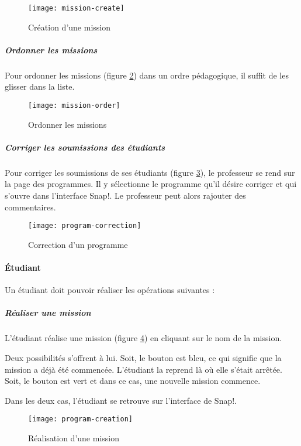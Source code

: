 \begin{figure}
  \begin{center}
    \texttt{[image: mission-create]}
    \caption{Création d'une mission}
    \label{fig:mission-create}
  \end{center}
\end{figure}

\subparagraph{Ordonner les missions} Pour ordonner les \glspl{mission} (figure \ref{fig:mission-order}) dans un ordre pédagogique, il suffit de les glisser dans la liste.
\begin{figure}
  \begin{center}
    \texttt{[image: mission-order]}
    \caption{Ordonner les missions}
    \label{fig:mission-order}
  \end{center}
\end{figure}

\subparagraph{Corriger les soumissions des étudiants} Pour corriger les soumissions de ses étudiants (figure \ref{fig:program-correction}), le professeur se rend sur la page des programmes. Il y sélectionne le programme qu'il désire corriger et qui s'ouvre dans l'interface Snap!. Le professeur peut alors rajouter des commentaires.
\begin{figure}
  \begin{center}
    \texttt{[image: program-correction]}
    \caption{Correction d'un programme}
    \label{fig:program-correction}
  \end{center}
\end{figure}

\paragraph{Étudiant}
Un étudiant doit pouvoir réaliser les opérations suivantes :
\subparagraph{Réaliser une mission} L'étudiant réalise une \gls{mission} (figure \ref{fig:program-creation}) en cliquant sur le nom de la \gls{mission}. 

Deux possibilités s'offrent à lui. Soit, le bouton est bleu, ce qui signifie que la \gls{mission} a déjà été commencée. L'étudiant la reprend là où elle s'était arrêtée. Soit, le bouton est vert et dans ce cas, une nouvelle \gls{mission} commence.

Dans les deux cas, l'étudiant se retrouve sur l'interface de Snap!.
\begin{figure}
  \begin{center}
    \texttt{[image: program-creation]}
    \caption{Réalisation d'une mission}
    \label{fig:program-creation}
  \end{center}
\end{figure}

